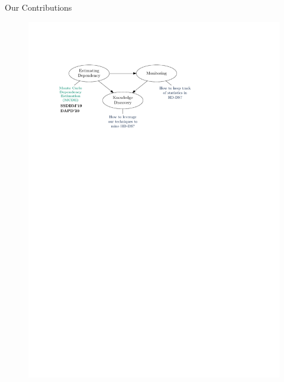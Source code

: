 \documentclass[16pt,usenames,dvipsnames, notheorems]{beamer}
\theoremstyle{definition}
\theoremstyle{example}
\theoremstyle{plain}
\begin{document}
\begin{frame}{Our Contributions}
\begin{figure}
\begin{overprint}
		 \includegraphics[width=1.0 \linewidth]{figures/outline_c_5-compressed.pdf}

\end{overprint}
\end{figure}
\end{frame}
\end{document}
